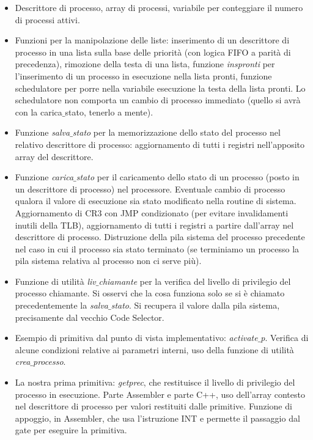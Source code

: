\begin{itemize}
\begin{itemize}
\begin{itemize}
			\item Descrittore di processo, array di processi, variabile per conteggiare il numero di processi attivi.
			\item Funzioni per la manipolazione delle liste: inserimento di un descrittore di processo in una lista sulla base delle priorità (con logica FIFO a parità di precedenza), rimozione della testa di una lista, funzione \emph{inspronti} per l'inserimento di un processo in esecuzione nella lista pronti, funzione schedulatore per porre nella variabile esecuzione la testa della lista pronti. Lo schedulatore non comporta un cambio di processo immediato (quello si avrà con la carica$\_$stato, tenerlo a mente).
			\item Funzione \emph{salva$\_$stato} per la memorizzazione dello stato del processo nel relativo descrittore di processo: aggiornamento di tutti i registri nell'apposito array del descrittore.
			\item Funzione \emph{carica$\_$stato} per il caricamento dello stato di un processo (posto in un descrittore di processo) nel processore. Eventuale cambio di processo qualora il valore di esecuzione sia stato modificato nella routine di sistema. Aggiornamento di CR3 con JMP condizionato (per evitare invalidamenti inutili della TLB), aggiornamento di tutti i registri a partire dall'array nel descrittore di processo. Distruzione della pila sistema del processo precedente nel caso in cui il processo sia stato terminato (se terminiamo un processo la pila sistema relativa al processo non ci serve più).
			\item Funzione di utilità \emph{liv$\_$chiamante} per la verifica del livello di privilegio del processo chiamante. Si osservi che la cosa funziona solo se si è chiamato precedentemente la \emph{salva$\_$stato}. Si recupera il valore dalla pila sistema, precisamente dal vecchio Code Selector.
			\item Esempio di primitiva dal punto di vista implementativo: \emph{activate$\_$p}. Verifica di alcune condizioni relative ai parametri interni, uso della funzione di utilità \emph{crea$\_$processo}.
			\item La nostra prima primitiva: \emph{getprec}, che restituisce il livello di privilegio del processo in esecuzione. Parte Assembler e parte C++, uso dell'array contesto nel descrittore di processo per valori restituiti dalle primitive. Funzione di appoggio, in Assembler, che usa l'istruzione INT e permette il passaggio dal gate per eseguire la primitiva.
		\end{itemize}
	\end{itemize}
	

\end{itemize}

